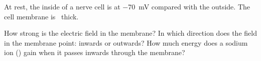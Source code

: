 At rest, the inside of a nerve cell is at \SI{-70}{\milli\volt} compared with the outside. The cell membrane is \dmO\ thick.

\begin{abcliste}
\abc How strong is the electric field in the membrane?
\abc In which direction does the field in the membrane point: inwards or outwards?
\abc How much energy does a sodium ion () gain when it passes inwards through the membrane?
\end{abcliste}
